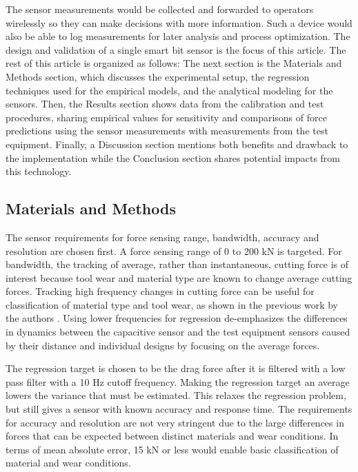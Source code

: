 The sensor measurements would be collected and forwarded to operators wirelessly 
so they can make decisions with more information.
Such a device would also be able to log measurements for later analysis and process optimization.
The design and validation of a single smart bit sensor is the focus of this article.
The rest of this article is organized as follows:
The next section is the Materials and Methods section, 
which discusses the experimental setup, 
the regression techniques used for the empirical models,
and the analytical modeling for the sensors. 
Then, the Results section shows data from the calibration and test procedures, 
sharing empirical values for sensitivity 
and comparisons of force predictions using the sensor measurements 
with measurements from the test equipment.
Finally, a Discussion section mentions both benefits and drawback to the implementation
while the Conclusion section shares potential impacts from this technology.

\subsection{Materials and Methods}

The sensor requirements for
force sensing range, bandwidth, accuracy and resolution are chosen first.
A force sensing range of 0 to 200 kN is targeted.
For bandwidth, the tracking of average,
 rather than instantaneous, cutting force is of interest 
because tool wear and material type are known to change average cutting forces.
Tracking high frequency changes in cutting force can be useful 
for classification of material type and tool wear, as shown in the previous work 
by the authors \cite{oltmanns2023low}.
Using lower frequencies for regression de-emphasizes the 
differences in dynamics between the capacitive sensor and the test equipment sensors
caused by their distance and individual designs by focusing on the average forces.

The regression target is chosen to be the drag force after it is filtered 
with a low pass filter with a 10 Hz cutoff frequency.
Making the regression target an average lowers the variance that must be estimated.
This relaxes the regression problem, but still gives a sensor with known accuracy and response time.
The requirements for accuracy and resolution are not very stringent due to the large differences 
in forces that can be expected between distinct materials and wear conditions.
In terms of mean absolute error, 15 kN or less would enable basic
classification of material and wear conditions.

